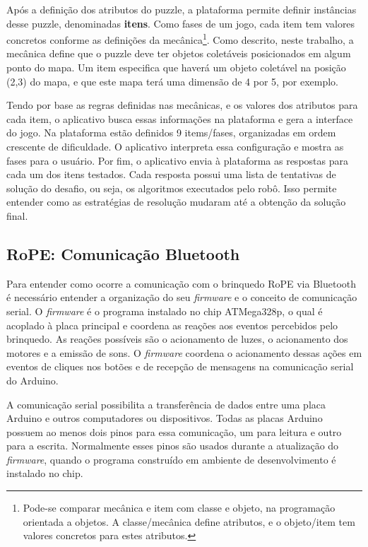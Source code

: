 Após a definição dos atributos do puzzle, a plataforma permite definir instâncias desse puzzle, denominadas \textbf{itens}. Como fases de um jogo, cada item tem valores concretos conforme as definições da mecânica\footnote{Pode-se comparar mecânica e item com classe e objeto, na programação orientada a objetos. A classe/mecânica define atributos, e o objeto/item tem valores concretos para estes atributos.}.  Como descrito, neste trabalho, a mecânica define que o puzzle deve ter objetos coletáveis posicionados em algum ponto do mapa. Um item especifica que haverá um objeto coletável na posição (2,3) do mapa, e que este mapa terá uma dimensão de 4 por 5, por exemplo. 

Tendo por base as regras definidas nas mecânicas, e os valores dos atributos para cada item, o aplicativo busca essas informações na plataforma e gera a interface do jogo. Na plataforma estão definidos 9 items/fases, organizadas em ordem crescente de dificuldade. O aplicativo interpreta essa configuração e mostra as fases para o usuário. Por fim, o aplicativo envia à plataforma as respostas para cada um dos itens testados. Cada resposta possui uma lista de tentativas de solução do desafio, ou seja, os algoritmos executados pelo robô. Isso permite entender como as estratégias de resolução mudaram até a obtenção da solução final.

\subsection{RoPE: Comunicação Bluetooth}
\label{sec:comunicacao}
Para entender como ocorre a comunicação com o brinquedo RoPE via Bluetooth é necessário entender a organização do seu \textit{firmware} e o conceito de comunicação serial. O \textit{firmware} é o programa instalado no chip ATMega328p, o qual é acoplado à placa principal e coordena as reações aos eventos percebidos pelo brinquedo. As reações possíveis são o acionamento de  luzes, o acionamento dos motores e a emissão de sons. O \textit{firmware} coordena o acionamento dessas ações em eventos de cliques nos botões e de recepção de mensagens na comunicação serial do Arduino.

A comunicação serial possibilita a transferência de dados entre uma placa Arduino e outros computadores ou dispositivos. Todas as placas Arduino possuem ao menos dois pinos para essa comunicação, um para leitura e outro para a escrita. Normalmente esses pinos são usados durante a atualização do \textit{firmware}, quando o programa construído em ambiente de desenvolvimento é instalado no chip.

